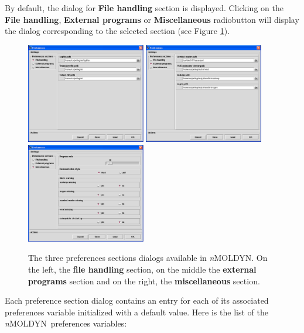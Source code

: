 \documentclass[a4paper,11pt]{report}
\newcommand{\NMOLDYN}{\textit{n}MOLDYN}
\begin{document}
By default, the dialog for \textbf{File handling} section is displayed. Clicking on the \textbf{File handling}, 
\textbf{External programs} or \textbf{Miscellaneous} radiobutton will display the dialog corresponding to the selected 
section (see Figure \ref{fig:preferences_sections}).
\begin{figure}[h!]
\begin{center}
\includegraphics[width=5.2cm]{Figures/preferences_file_handling.eps}
\includegraphics[width=5.2cm]{Figures/preferences_external_programs.eps}
\includegraphics[width=5.2cm]{Figures/preferences_miscellaneous.eps}
\end{center}
\caption[The three preferences sections]{The three preferences sections dialogs available in \NMOLDYN . On the left, 
the \textbf{file handling} section, on the middle the \textbf{external programs} section and on the right, the \textbf{miscellaneous} section.}
\label{fig:preferences_sections}
\end{figure}   
\newpage
Each preference section dialog contains an entry for each of its associated preferences variable initialized with a 
default value. Here is the list of the \NMOLDYN\ preferences variables:
\hypertarget{preferences_logfile_path}{}
\end{document}
